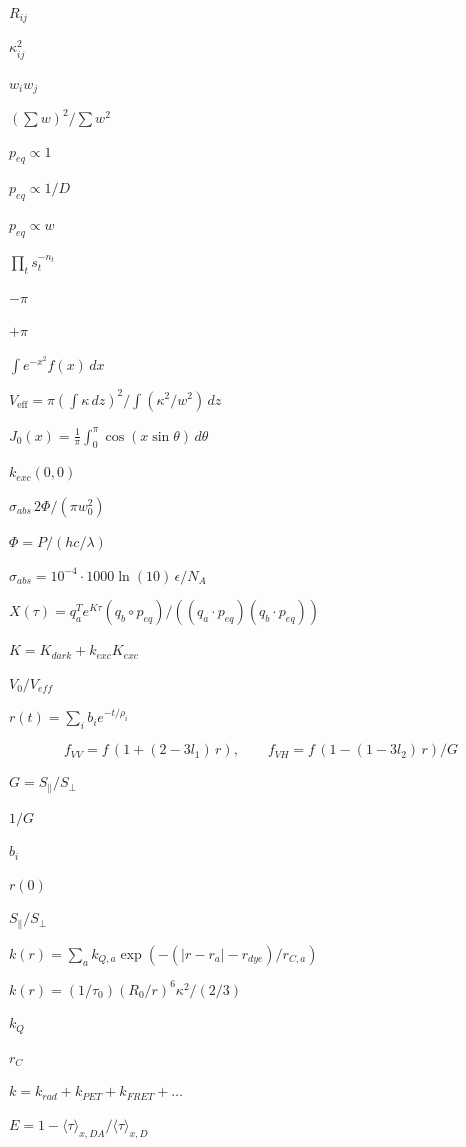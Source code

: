 \documentclass{article}
\begin{document}
$R_{ij}$
\pagebreak

$\kappa^2_{ij}$
\pagebreak

$w_i w_j$
\pagebreak

$(\sum w)^2 / \sum w^2$
\pagebreak

$p_{eq} \propto 1$
\pagebreak

$p_{eq} \propto 1/D$
\pagebreak

$p_{eq} \propto w$
\pagebreak

$\prod_t s_t^{-n_t}$
\pagebreak

$-\pi$
\pagebreak

$+\pi$
\pagebreak

$\int e^{-x^2} f(x)\,dx$
\pagebreak

$V_\mathrm{eff} = \pi (\int \kappa\,dz)^2 / \int (\kappa^2/w^2)\,dz$
\pagebreak

$J_0(x) = \frac{1}{\pi}\int_0^\pi \cos(x\sin\theta)\,d\theta$
\pagebreak

$k_{exc}(0,0)$
\pagebreak

$\sigma_{abs}\, 2\Phi/(\pi w_0^2)$
\pagebreak

$\Phi = P/(h c/\lambda)$
\pagebreak

$\sigma_{abs} = 10^{-4}\cdot 1000\ln(10)\,\epsilon/N_A$
\pagebreak

$X(\tau) = q_a^T e^{K\tau} (q_b \circ p_{eq}) /
((q_a\cdot p_{eq})(q_b\cdot p_{eq}))$
\pagebreak

$K = K_{dark} + k_{exc} K_{exc}$
\pagebreak

$V_0/V_{eff}$
\pagebreak

$r(t) = \sum_i b_i e^{-t/\rho_i}$
\pagebreak

\[  f_{VV} = f\,(1 + (2 - 3 l_1)\,r), \qquad
  f_{VH} = f\,(1 - (1 - 3 l_2)\,r) / G
\]
\pagebreak

$G = S_\parallel / S_\perp$
\pagebreak

$1/G$
\pagebreak

$b_i$
\pagebreak

$r(0)$
\pagebreak

$S_\parallel / S_\perp$
\pagebreak

$k(r) = \sum_a k_{Q,a} \exp(-(|r - r_a| - r_{dye}) / r_{C,a})$
\pagebreak

$k(r) = (1/\tau_0) (R_0/r)^6 \kappa^2 / (2/3)$
\pagebreak

$k_Q$
\pagebreak

$r_C$
\pagebreak

$k = k_{rad} + k_{PET} + k_{FRET} + \dots$
\pagebreak

$E = 1 - \langle\tau\rangle_{x,DA} / \langle\tau\rangle_{x,D}$
\pagebreak
\end{document}
